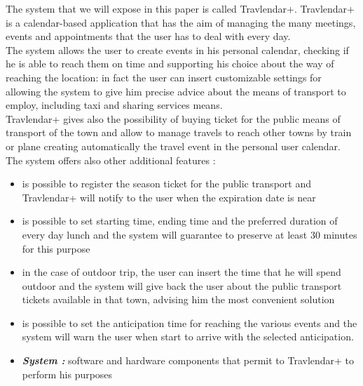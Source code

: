\vspace*{-5mm}
The system that we will expose in this paper is called Travlendar+.
Travlendar+ is a calendar-based application that has the aim of managing the many meetings, events and appointments that the user has to deal with every day.\\
\indent The system allows the user to create events in his personal calendar, checking if he is able to reach them on time and supporting his choice about the way of reaching the location: in fact the user can insert customizable settings for allowing the system to give him precise advice about the means of transport to employ, including taxi and sharing services means.\\
\indent Travlendar+ gives also the possibility of buying ticket for the public means of transport of the town and allow to manage travels to reach other towns by train or plane creating automatically the travel event in the personal user calendar.\\
The system offers also other additional features :
\begin{itemize}
\setlength{\leftskip}{0.5cm}
\item is possible to register the season ticket for the public transport and Travlendar+ will notify to the user when the expiration date is near
\item is possible to set starting time, ending time and the preferred duration of every day lunch and the system will guarantee to preserve at least 30 minutes for this purpose
\item in the case of outdoor trip, the user can insert the time that he will spend outdoor and the system will give back the user about the public transport tickets available in that town, advising him the most convenient solution
\item is possible to set the anticipation time for reaching the various events and the system will warn the user when start to arrive with the selected anticipation.
\end{itemize}
\begin{itemize}
	\setlength{\leftskip}{0.5cm}
	\item \emph{\textbf{System : }}software and hardware components that permit to Travlendar+ to perform his purposes
\end{itemize}
